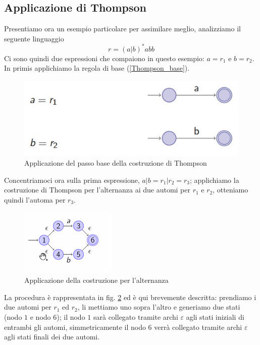 \documentclass[class=book, crop=false, oneside, 12pt]{standalone}
\begin{document}
\subsection{Applicazione di Thompson}
Presentiamo ora un esempio particolare per assimilare meglio, analizziamo il seguente linguaggio
\begin{equation}
    r= (a | b)^* abb
\end{equation}
Ci sono quindi due espressioni che compaiono in questo esempio: \(a = r_1\) e \(b = r_2\).
In primis applichiamo la regola di base (\ref{Thompson_base}).

\begin{figure}
    \centering
    \includegraphics[width=.7\textwidth,keepaspectratio]{esempio_Thompson_0}
    \caption{Applicazione del passo base della costruzione di Thompson}
    \label{esempio_Thompson_0}
\end{figure}
Concentriamoci ora sulla prima espressione, \( a|b = r_1 | r_2 = r_3\); applichiamo la costruzione di Thompson per l’alternanza ai due automi per \(r_1\) e \(r_2\), otteniamo quindi l’automa per \(r_3\).
\begin{figure}
    \centering
    \includegraphics[width=.4\textwidth,keepaspectratio]{esempio_Thompson_1}
    \caption{Applicazione della costruzione per l'alternanza}
    \label{esempio_Thompson_1}
\end{figure}
La procedura è rappresentata in fig. \ref{esempio_Thompson_1} ed è qui brevemente descritta: prendiamo i due automi per \(r_1\) ed \(r_2\), li mettiamo uno sopra l’altro e generiamo due stati (nodo \(1\) e nodo \(6\)); il nodo \(1\) sarà collegato tramite archi \(\varepsilon\) agli stati iniziali di entrambi gli automi, simmetricamente il nodo \(6\) verrà collegato tramite archi \(\varepsilon\) agli stati finali dei due automi.
\end{document}
